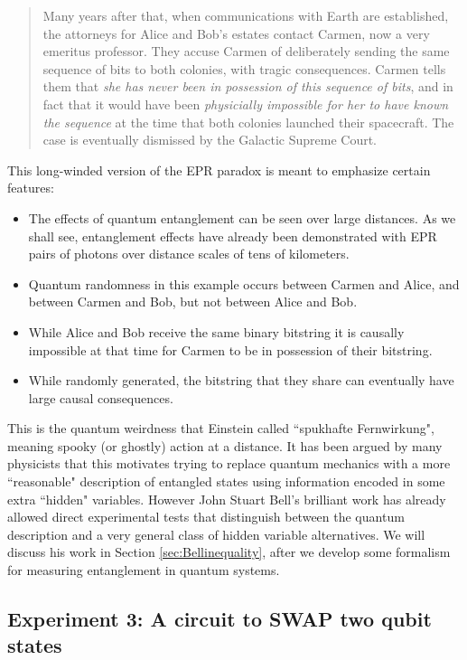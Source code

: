 \documentclass[a4paper,11pt]{article}
\begin{document}
\begin{quotation}
Many years after that, when
communications with Earth are established, the attorneys for Alice and Bob's estates contact Carmen, now a very emeritus professor. They accuse Carmen
of deliberately sending the same sequence of bits to both colonies, with tragic consequences. Carmen tells them that {\it she has never been in possession of this sequence of bits},
and in fact that it would have been {\it physicially impossible for her to have known the sequence} at the time that both colonies launched their spacecraft. The case
is eventually dismissed by the Galactic Supreme Court.
\end{quotation}
 
This long-winded version of the EPR paradox is meant to emphasize certain features:
\begin{itemize}
\item The effects of quantum entanglement can be seen over large distances. As we shall see, entanglement effects have already been demonstrated with
EPR pairs of photons over
distance scales of tens of kilometers. 
\item Quantum randomness in this example occurs between Carmen and Alice, and between Carmen and Bob, but not between Alice and Bob.
\item While Alice and Bob receive the same binary bitstring it is causally impossible at that time for Carmen to be in possession of their bitstring.
\item While randomly generated, the bitstring that they share can eventually have large causal consequences.
\end{itemize}
 
This is the quantum weirdness that Einstein called ``spukhafte Fernwirkung", meaning spooky (or ghostly) action at a distance.
It has been argued by many physicists that this motivates trying to replace quantum mechanics with a more ``reasonable" description
of entangled states using information encoded in some extra ``hidden" variables. However John Stuart Bell's brilliant work has already
allowed direct experimental tests that distinguish between the quantum description and a very general class of hidden variable alternatives.
We will discuss his work in Section \ref{sec:Bellinequality}, after we develop some formalism for measuring entanglement in quantum systems.







\subsection{Experiment 3: A circuit to SWAP two qubit states} 
\end{document}
